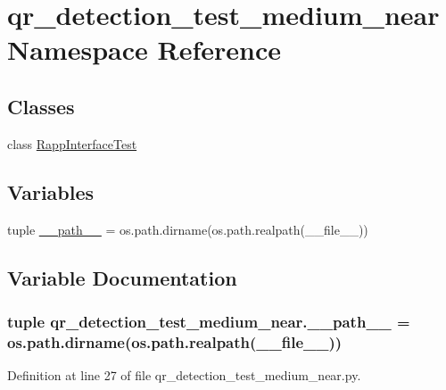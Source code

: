 \hypertarget{namespaceqr__detection__test__medium__near}{\section{qr\-\_\-detection\-\_\-test\-\_\-medium\-\_\-near Namespace Reference}
\label{namespaceqr__detection__test__medium__near}
}
\subsection*{Classes}
\begin{DoxyCompactItemize}
\item 
class \hyperlink{classqr__detection__test__medium__near_1_1RappInterfaceTest}{Rapp\-Interface\-Test}
\end{DoxyCompactItemize}
\subsection*{Variables}
\begin{DoxyCompactItemize}
\item 
tuple \hyperlink{namespaceqr__detection__test__medium__near_ac719aa2303b5cf76036c41159121fa80}{\-\_\-\-\_\-path\-\_\-\-\_\-} = os.\-path.\-dirname(os.\-path.\-realpath(\-\_\-\-\_\-file\-\_\-\-\_\-))
\end{DoxyCompactItemize}


\subsection{Variable Documentation}
\hypertarget{namespaceqr__detection__test__medium__near_ac719aa2303b5cf76036c41159121fa80}{
\subsubsection[{\-\_\-\-\_\-path\-\_\-\-\_\-}]{\setlength{\rightskip}{0pt plus 5cm}tuple qr\-\_\-detection\-\_\-test\-\_\-medium\-\_\-near.\-\_\-\-\_\-path\-\_\-\-\_\- = os.\-path.\-dirname(os.\-path.\-realpath(\-\_\-\-\_\-file\-\_\-\-\_\-))}}\label{namespaceqr__detection__test__medium__near_ac719aa2303b5cf76036c41159121fa80}


Definition at line 27 of file qr\-\_\-detection\-\_\-test\-\_\-medium\-\_\-near.\-py.

